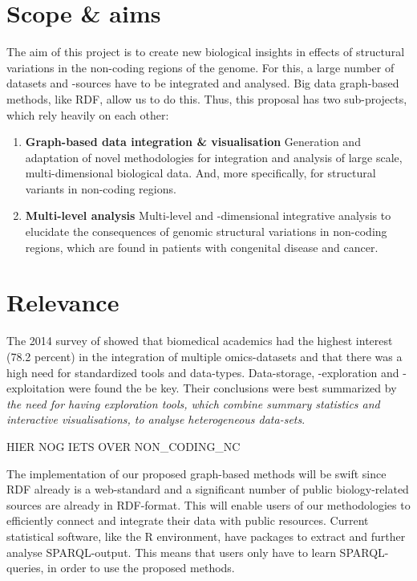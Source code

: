 \documentclass[twoside,fontsize=12pt]{article}
\begin{document}
\section*{Scope \& aims}
The aim of this project is to create new biological insights in effects of structural variations in the non-coding regions of the genome. For this, a large number of datasets and -sources have to be integrated and analysed. Big data graph-based methods, like RDF,  allow us to do this.
Thus, this proposal has two sub-projects, which rely heavily on each other:

\begin{enumerate}
\item \textbf{Graph-based data integration \& visualisation} 
Generation and adaptation of novel methodologies for integration and analysis of large scale, multi-dimensional biological data. And, more specifically, for structural variants in non-coding regions.
\item \textbf{Multi-level analysis} 
Multi-level and -dimensional integrative analysis to elucidate the consequences of genomic structural variations in non-coding regions, which are found in patients with congenital disease and cancer. 
\end{enumerate}
\section*{Relevance}
The 2014 survey of \citet{Gomez-Cabrero2014} showed that biomedical academics had the highest interest (78.2 percent) in the integration of multiple omics-datasets and that there was a high need for standardized tools and data-types. Data-storage, -exploration and -exploitation were found the be key. Their conclusions were best summarized by \textit{the need for having exploration tools, which combine summary statistics and interactive visualisations, to analyse heterogeneous data-sets}.
\medskip

\noindent
HIER NOG IETS OVER NON\_CODING\_NC
\medskip

\noindent
The implementation of our proposed graph-based methods will be swift since RDF already is a web-standard and a significant number of public biology-related sources are already in RDF-format. This will enable users of our methodologies to efficiently connect and integrate their data with public resources. Current statistical software, like the R environment, have packages to extract and further analyse SPARQL-output. This means that users only have to learn SPARQL-queries, in order to use the proposed methods.
\end{document}
